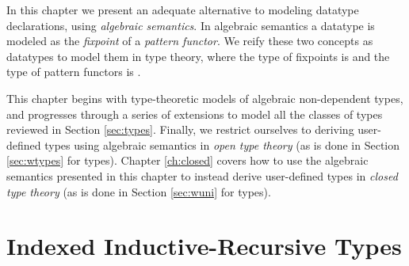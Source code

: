 \documentclass[12pt]{report}
\newcommand{\refch}[1]{Chapter \ref{ch:#1}}
\newcommand{\refsec}[1]{Section \ref{sec:#1}}
\newcommand{\AgdaData}[1]{\AgdaDatatype{#1}}
\theoremstyle{definition}
\theoremstyle{remark}
\numberwithin{definition}{section}
\numberwithin{equation}{section}
\numberwithin{proposition}{section}
\numberwithin{conjecture}{section}
\numberwithin{theorem}{section}
\numberwithin{lemma}{section}
\numberwithin{corollary}{section}
\numberwithin{example}{section}
\numberwithin{remark}{section}
\begin{document}
In this chapter we present an adequate alternative to modeling
datatype declarations, using \textit{algebraic semantics}. In
algebraic semantics a datatype is modeled as the \textit{fixpoint}
of a \textit{pattern functor}. We reify these two concepts as
datatypes to model them in type theory, where the type of fixpoints is
\AgdaData{μ} and the type of pattern functors is \AgdaData{Desc}.

This chapter begins with type-theoretic models of algebraic
non-dependent types, and progresses through a series of
extensions to model all the classes of types reviewed in
\refsec{types}. Finally, we restrict ourselves to deriving
user-defined types using algebraic semantics in
\textit{open type theory} (as is done in \refsec{wtypes} for
\AgdaData{W} types).
\refch{closed} covers how to use the
algebraic semantics presented in this chapter to instead derive
user-defined types in \textit{closed type theory} (as is done
in \refsec{wuni} for \AgdaData{W} types).






\section{Indexed Inductive-Recursive Types}





\end{document}
